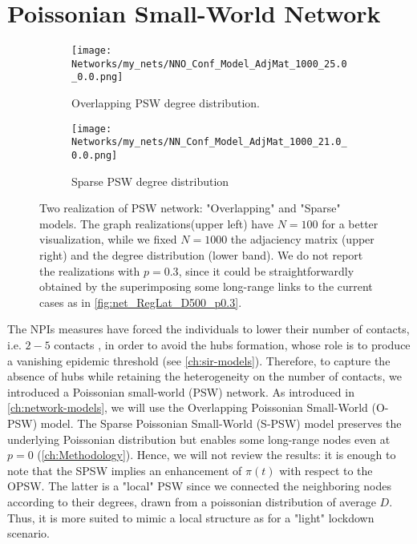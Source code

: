 \documentclass[a4paper,10pt, oneside]{book} %
\theoremstyle{definition}
\begin{document}
\section{Poissonian Small-World Network}
\label{sec:res_PSW}
\begin{figure}[ht]
    \begin{subfigure}{.45\linewidth}
        \texttt{[image: Networks/my\_nets/NNO\_Conf\_Model\_AdjMat\_1000\_25.0\_0.0.png]}
        \centering
        \caption{Overlapping PSW degree distribution. }
        \label{fig:net_O-PSW}
    \end{subfigure}
	\hfill
	\begin{subfigure}{.45\linewidth}
        \texttt{[image: Networks/my\_nets/NN\_Conf\_Model\_AdjMat\_1000\_21.0\_0.0.png]}
        \centering
        \caption{Sparse PSW degree distribution}
        \label{fig:net_S-PSW}
    \end{subfigure}
	\caption{Two realization of PSW network: "Overlapping" and "Sparse" models. The graph realizations(upper left) have $ N = 100$ for a better visualization, while we fixed $ N = 1000$ the adjaciency matrix (upper right) and the degree distribution (lower band). We do not report the realizations with $p = 0.3$, since it could be straightforwardly obtained by the superimposing some long-range links to the current cases as in \autoref{fig:net_RegLat_D500_p0.3}.}
\end{figure}
The NPIs measures have forced the individuals to lower their number of contacts, i.e. $2-5$ contacts \cite{Liu::2021_Review_SContactPattern}, in order to avoid the hubs formation, whose role is to produce a vanishing epidemic threshold (see \autoref{ch:sir-models}).
Therefore, to capture the absence of hubs while retaining the heterogeneity on the number of contacts, we introduced a Poissonian small-world (PSW) network.
As introduced in \autoref{ch:network-models}, we will use the Overlapping Poissonian Small-World (O-PSW) model. The Sparse Poissonian Small-World (S-PSW) model preserves the underlying Poissonian distribution but enables some long-range nodes even at $ p = 0$ (\autoref{ch:Methodology}). Hence, we will not review the results: it is enough to note that the SPSW implies an enhancement of $\pi(t)$ with respect to the OPSW. The latter is a "local" PSW since we connected the neighboring nodes according to their degrees, drawn from a poissonian distribution of average $ D$. Thus, it is more suited to mimic a local structure as for a "light" lockdown scenario.  
\end{document}
